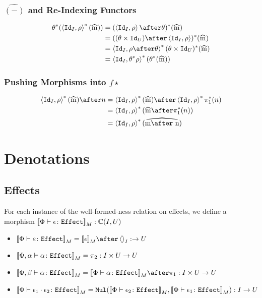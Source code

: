 \documentclass{report}
\begin{document}
\subsection{$\hat{(-)}$ and Re-Indexing Functors}
\begin{align}
    \theta\star(\pr{\Id{I}}{\rho}\star(\widehat{m})) &= (\pr{\Id{I}}{\rho}\after\theta)\star(\widehat{m})\\
    & = ((\theta\times\Id{U})\after\pr{\Id{I}}{\rho})\star(\widehat{m})\\
    & = \pr{\Id{I}}{\rho\after\theta}\star(\theta\times\Id{U})\star(\widehat{m}) \\
    & = \pr{\Id{I}}{\theta\star\rho}\star(\theta\star(\widehat{m}))
\end{align}

\subsection{Pushing Morphisms into $f\star$}

\begin{align}
    \pr{\Id{I}}{\rho}\star(\widehat{m})\after n &= \pr{\Id{I}}{\rho}\star(\widehat{m})\after\pr{\Id{I}}{\rho}\star\p\star(n)\\
    & = \pr{\Id{I}}{\rho}\star(\widehat{m}\after\pstar(n))\\
    &= \pr{\Id{I}}{\rho}\star(\widehat{m\after n})
\end{align}

\chapter{Denotations}
\section{Effects}
For each instance of the well-formed-ness relation on effects, we define a morphism ${\bf [\![}\Phi \vdash \epsilon \colon \texttt{Effect}{\bf ]\!]}_M: \mathbb{C}(I, U)$

\begin{itemize}
    \item $\deno{\typerelation{\P}{e}{\effect}} = \deno{\e} \after \term{I}: \rightarrow U$
    \item ${\bf [\![}\Phi,\alpha \vdash \alpha \colon \texttt{Effect}{\bf ]\!]}_M = \pi_2: I\times U \rightarrow U$
    
    \item $\deno{\typerelation{\P, \b}{\a}{\effect}} = \deno{\typerelation{\P}{\a}{\effect}}\after\p: I\times U\rightarrow U$
    
    \item ${\bf [\![}\Phi \vdash \epsilon_1\cdot \epsilon_2 \colon \texttt{Effect}{\bf ]\!]}_M = \texttt{Mul}({\bf [\![}\Phi \vdash \epsilon_2 \colon \texttt{Effect}{\bf ]\!]}_M,{\bf [\![}\Phi \vdash \epsilon_1 \colon \texttt{Effect}{\bf ]\!]}_M): I \rightarrow U$
\end{itemize}
\end{document}
